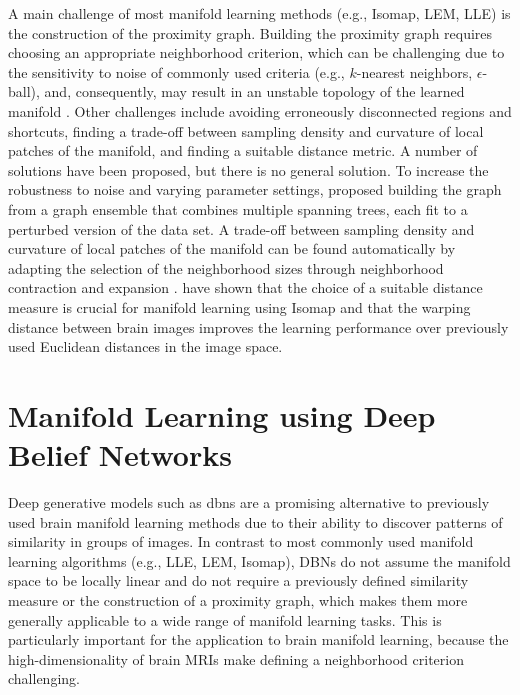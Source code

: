 A main challenge of most manifold learning methods (e.g., Isomap, LEM, LLE) is
the construction of the proximity graph. Building the proximity graph requires
choosing an appropriate neighborhood criterion, which can be challenging due to
the sensitivity to noise of commonly used criteria (e.g., $k$-nearest neighbors,
$\epsilon$-ball), and, consequently, may result in an unstable topology of the
learned manifold \citep{balasubramanian2002}. Other challenges include avoiding
erroneously disconnected regions and shortcuts, finding a trade-off between
sampling density and curvature of local patches of the manifold, and finding a
suitable distance metric. A number of solutions have been proposed, but there is
no general solution. To increase the robustness to noise and varying parameter
settings, \citet{carreira2005} proposed building the graph from a graph ensemble
that combines multiple spanning trees, each fit to a perturbed version of the
data set. A trade-off between sampling density and curvature of local patches of
the manifold can be found automatically by adapting the selection of the
neighborhood sizes through neighborhood contraction and expansion
\citep{zhang2012}. \citet{gerber2010} have shown that the choice of a suitable
distance measure is crucial for manifold learning using Isomap and that the
warping distance between brain images improves the learning performance over
previously used Euclidean distances in the image space.

\section[Manifold learning using deep belief networks]{Manifold Learning using
Deep Belief Networks}

Deep generative models such as \glspl{dbn} \citep{hinton2006b} are a promising
alternative to previously used brain manifold learning methods due to their
ability to discover patterns of similarity in groups of images. In contrast to
most commonly used manifold learning algorithms (e.g., LLE, LEM, Isomap), DBNs
do not assume the manifold space to be locally linear and do not require a
previously defined similarity measure or the construction of a proximity graph,
which makes them more generally applicable to a wide range of manifold learning
tasks. This is particularly important for the application to brain manifold
learning, because the high-dimensionality of brain MRIs make defining a
neighborhood criterion challenging.


